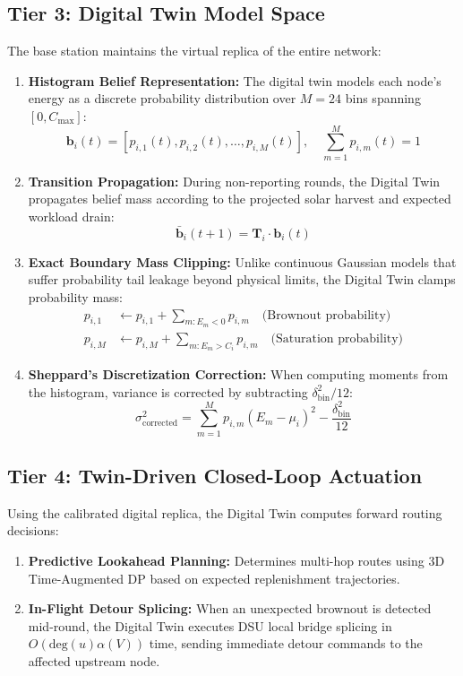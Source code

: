 \documentclass[journal]{IEEEtran}
\begin{document}
\subsection{Tier 3: Digital Twin Model Space}
The base station maintains the virtual replica of the entire network:
\begin{enumerate}
    \item \textbf{Histogram Belief Representation:} The digital twin models each node's energy as a discrete probability distribution over $M = 24$ bins spanning $[0, C_{\text{max}}]$:
    \begin{equation}
    \mathbf{b}_i(t) = [p_{i, 1}(t), p_{i, 2}(t), \dots, p_{i, M}(t)], \quad \sum_{m=1}^M p_{i, m}(t) = 1
    \end{equation}
    \item \textbf{Transition Propagation:} During non-reporting rounds, the Digital Twin propagates belief mass according to the projected solar harvest and expected workload drain:
    \begin{equation}
    \bar{\mathbf{b}}_i(t+1) = \mathbf{T}_i \cdot \mathbf{b}_i(t)
    \end{equation}
    \item \textbf{Exact Boundary Mass Clipping:} Unlike continuous Gaussian models that suffer probability tail leakage beyond physical limits, the Digital Twin clamps probability mass:
    \begin{align}
    p_{i, 1} &\leftarrow p_{i, 1} + \sum_{m: E_m < 0} p_{i, m} \quad \text{(Brownout probability)} \\
    p_{i, M} &\leftarrow p_{i, M} + \sum_{m: E_m > C_i} p_{i, m} \quad \text{(Saturation probability)}
    \end{align}
    \item \textbf{Sheppard's Discretization Correction:} When computing moments from the histogram, variance is corrected by subtracting $\delta_{\text{bin}}^2 / 12$:
    \begin{equation}
    \sigma_{\text{corrected}}^2 = \sum_{m=1}^M p_{i, m} (E_m - \mu_i)^2 - \frac{\delta_{\text{bin}}^2}{12}
    \end{equation}
\end{enumerate}

\subsection{Tier 4: Twin-Driven Closed-Loop Actuation}
Using the calibrated digital replica, the Digital Twin computes forward routing decisions:
\begin{enumerate}
    \item \textbf{Predictive Lookahead Planning:} Determines multi-hop routes using 3D Time-Augmented DP based on expected replenishment trajectories.
    \item \textbf{In-Flight Detour Splicing:} When an unexpected brownout is detected mid-round, the Digital Twin executes DSU local bridge splicing in $O(\text{deg}(u)\alpha(V))$ time, sending immediate detour commands to the affected upstream node.
\end{enumerate}
\end{document}
